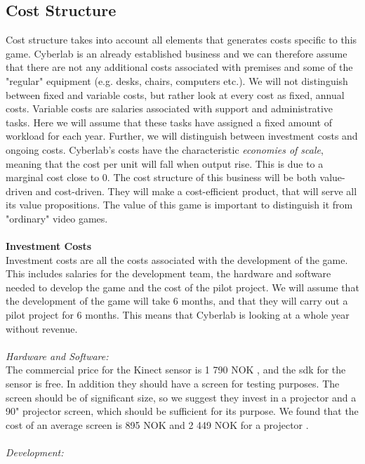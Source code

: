 \subsection{Cost Structure}
Cost structure takes into account all elements that generates costs specific to this game. Cyberlab is an already established business and we can therefore assume that there are not any additional costs associated with premises and some of the "regular" equipment (e.g. desks, chairs, computers etc.). We will not distinguish between fixed and variable costs, but rather look at every cost as fixed, annual costs. Variable costs are salaries associated with support and administrative tasks. Here we will assume that these tasks have assigned a fixed amount of workload for each year. Further, we will distinguish between investment costs and ongoing costs. Cyberlab's costs have the characteristic \emph{economies of scale}, meaning that the cost per unit will fall when output rise. This is due to a marginal cost close to 0.  The cost structure of this business will be both value-driven and cost-driven. They will make a cost-efficient product, that will serve all its value propositions. The value of this game is important to distinguish it from "ordinary" video games. \\ \\
\textbf{Investment Costs}\\
Investment costs are all the costs associated with the development of the game. This includes salaries for the development team, the hardware and software needed to develop the game and the cost of the pilot project. We will assume that the development of the game will take 6 months, and that they will carry out a pilot project for 6 months. This means that Cyberlab is looking at a whole year without revenue.\\ \\
\emph{Hardware and Software:}\\
The commercial price for the Kinect sensor is 1 790 NOK \cite{pricekinect}, and the \ac{sdk} for the sensor is free. In addition they should have a screen for testing purposes. The screen should be of significant size, so we suggest they invest in a projector and a 90" projector screen, which should be sufficient for its purpose. We found that the cost of an average screen is 895 NOK and 2 449 NOK for a projector \cite{priceprojector}\cite{pricescreen}.\\ \\
\emph{Development:}\\
